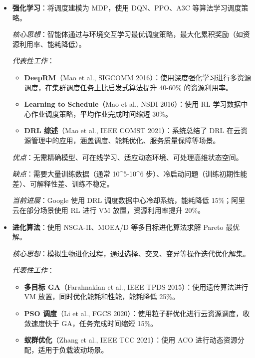 \documentclass[12pt,a4paper]{article}
\begin{document}
\begin{itemize}
    \item \textbf{强化学习}：将调度建模为 MDP，使用 DQN、PPO、A3C 等算法学习调度策略。
    
    \textit{核心思想}：智能体通过与环境交互学习最优调度策略，最大化累积奖励（如资源利用率、能耗降低）。
    
    \textit{代表性工作}：
    \begin{itemize}
        \item \textbf{DeepRM}（Mao et al., SIGCOMM 2016）：使用深度强化学习进行多资源调度，在集群调度任务上比启发式算法提升 40-60\% 的资源利用率\cite{mao2016deep}。
        \item \textbf{Learning to Schedule}（Mao et al., NSDI 2016）：使用 RL 学习数据中心作业调度策略，平均作业完成时间缩短 30\%\cite{mao2016learning}。
        \item \textbf{DRL 综述}（Mao et al., IEEE COMST 2021）：系统总结了 DRL 在云资源管理中的应用，涵盖调度、能耗优化、服务质量保障等场景\cite{mao2021deep}。
    \end{itemize}
    
    \textit{优点}：无需精确模型、可在线学习、适应动态环境、可处理高维状态空间。
    
    \textit{缺点}：需要大量训练数据（通常 10^5-10^6 步）、冷启动问题（训练初期性能差）、可解释性差、训练不稳定。
    
    \textit{当前进展}：Google 使用 DRL 调度数据中心冷却系统，能耗降低 15\%；阿里云在部分场景使用 RL 进行 VM 放置，资源利用率提升 20\%。
    
    \item \textbf{进化算法}：使用 NSGA-II、MOEA/D 等多目标进化算法求解 Pareto 最优解。
    
    \textit{核心思想}：模拟生物进化过程，通过选择、交叉、变异等操作迭代优化解集。
    
    \textit{代表性工作}：
    \begin{itemize}
        \item \textbf{多目标 GA}（Farahnakian et al., IEEE TPDS 2015）：使用遗传算法进行 VM 放置，同时优化能耗和性能，能耗降低 25\%\cite{farahnakian2015multi}。
        \item \textbf{PSO 调度}（Li et al., FGCS 2020）：使用粒子群优化进行云资源调度，收敛速度快于 GA，任务完成时间缩短 15\%\cite{li2020particle}。
        \item \textbf{蚁群优化}（Zhang et al., IEEE TCC 2021）：使用 ACO 进行动态资源分配，适用于负载波动场景\cite{zhang2021ant}。
    \end{itemize}
    

\end{itemize}
\end{document}
